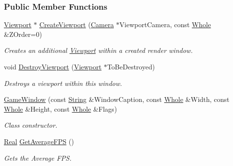 \subsubsection*{Public Member Functions}
\begin{DoxyCompactItemize}
\item 
\hyperlink{classMezzanine_1_1Viewport}{Viewport} $\ast$ \hyperlink{classMezzanine_1_1GameWindow_a9a5c31130d7d2970d1c0141173bcdce3}{CreateViewport} (\hyperlink{classMezzanine_1_1Camera}{Camera} $\ast$ViewportCamera, const \hyperlink{namespaceMezzanine_adcbb6ce6d1eb4379d109e51171e2e493}{Whole} \&ZOrder=0)
\begin{DoxyCompactList}\small\item\em Creates an additional \hyperlink{classMezzanine_1_1Viewport}{Viewport} within a created render window. \item\end{DoxyCompactList}\item 
void \hyperlink{classMezzanine_1_1GameWindow_a810561a4b96667bf88be137722d44407}{DestroyViewport} (\hyperlink{classMezzanine_1_1Viewport}{Viewport} $\ast$ToBeDestroyed)
\begin{DoxyCompactList}\small\item\em Destroys a viewport within this window. \item\end{DoxyCompactList}\item 
\hyperlink{classMezzanine_1_1GameWindow_aa1e4dd956e39174acd5f86b9b549cd77}{GameWindow} (const \hyperlink{namespaceMezzanine_acf9fcc130e6ebf08e3d8491aebcf1c86}{String} \&WindowCaption, const \hyperlink{namespaceMezzanine_adcbb6ce6d1eb4379d109e51171e2e493}{Whole} \&Width, const \hyperlink{namespaceMezzanine_adcbb6ce6d1eb4379d109e51171e2e493}{Whole} \&Height, const \hyperlink{namespaceMezzanine_adcbb6ce6d1eb4379d109e51171e2e493}{Whole} \&Flags)
\begin{DoxyCompactList}\small\item\em Class constructor. \item\end{DoxyCompactList}\item 
\hyperlink{namespaceMezzanine_a726731b1a7df72bf3583e4a97282c6f6}{Real} \hyperlink{classMezzanine_1_1GameWindow_ad6dcba20b92b4881a35a872ba36037d5}{GetAverageFPS} ()
\begin{DoxyCompactList}\small\item\em Gets the Average FPS. \item\end{DoxyCompactList}\item 

\end{DoxyCompactItemize}

